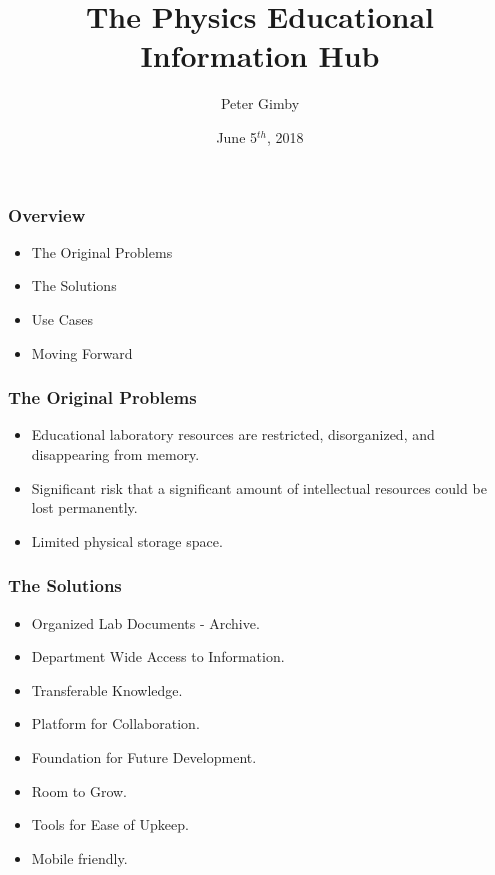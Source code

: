 \documentclass{beamer} %
\title[Lab Information Hub]{The Physics Educational Information Hub}
\author{Peter Gimby}
\institute[UCalgary]{University of Calgary}
\date{June 5$^{th}$, 2018}
\begin{document}
\frame[plain]{\titlepage}

\begin{frame}
\frametitle{Overview}
	\begin{itemize}
		\item{The Original Problems}
		\item{The Solutions}
		\item{Use Cases}
		\item{Moving Forward}
	\end{itemize}
\end{frame}
	
\begin{frame}
\frametitle{The Original Problems}\color{black}
	\begin{itemize}
    		\item Educational laboratory resources are restricted, disorganized, and 							disappearing from memory.
		\item Significant risk that a significant amount of intellectual 									resources could be lost permanently.
		\item Limited physical storage space.
	\end{itemize}
\end{frame}


\begin{frame}
\frametitle{The Solutions}\color{black}
	\begin{itemize}
		\item Organized Lab Documents - Archive.
		\item Department Wide Access to Information.
		\item Transferable Knowledge.
		\item Platform for Collaboration.
		\item Foundation for Future Development.
		\item Room to Grow.
		\item Tools for Ease of Upkeep.
		\item Mobile friendly.
	\end{itemize}
\end{frame}
\end{document}
